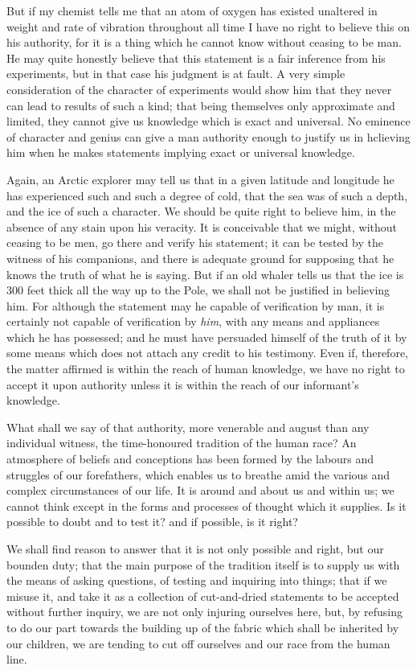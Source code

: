 \documentclass[12pt]{article}
\begin{document}
But if my chemist tells me that an atom of oxygen has existed unaltered in weight and rate of vibration throughout all time I have no right to believe this on his authority, for it is a thing which he cannot know without ceasing to be man. He may quite honestly believe that this statement is a fair inference from his experiments, but in that case his judgment is at fault. A very simple consideration of the character of experiments would show him that they never can lead to results of such a kind; that being themselves only approximate and limited, they cannot give us knowledge which is exact and universal. No eminence of character and genius can give a man authority enough to justify us in hclieving him when he makes statements implying exact or universal knowledge.

Again, an Arctic explorer may tell us that in a given latitude and longitude he has experienced such and such a degree of cold, that the sea was of such a depth, and the ice of such a character. We should be quite right to believe him, in the absence of any stain upon his veracity. It is conceivable that we might, without ceasing to be men, go there and verify his statement; it can be tested by the witness of his companions, and there is adequate ground for supposing that he knows the truth of what he is saying. But if an old whaler tells us that the ice is 300 feet thick all the way up to the Pole, we shall not be justified in believing him. For although the statement may he capable of verification by man, it is certainly not capable of verification by \emph{him},  with any means and appliances which he has possessed; and he must have persuaded himself of the truth of it by some means which does not attach any credit to his testimony. Even if, therefore, the matter affirmed is within the reach of human knowledge, we have no right to accept it upon authority unless it is within the reach of our informant's knowledge.

What shall we say of that authority, more venerable and august than any individual witness, the time-honoured tradition of the human race? An atmosphere of beliefs and conceptions has been formed by the labours and struggles of our forefathers, which enables us to breathe amid the various and complex circumstances of our life. It is around and about us and within us; we cannot think except in the forms and processes of thought which it supplies. Is it possible to doubt and to test it? and if possible, is it right?

We shall find reason to answer that it is not only possible and right, but our bounden duty; that the main purpose of the tradition itself is to supply us with the means of asking questions, of testing and inquiring into things; that if we misuse it, and take it as a collection of cut-and-dried statements to be accepted without further inquiry, we are not only injuring ourselves here, but, by refusing to do our part towards the building up of the fabric which shall be inherited by our children, we are tending to cut off ourselves and our race from the human line.
\end{document}
